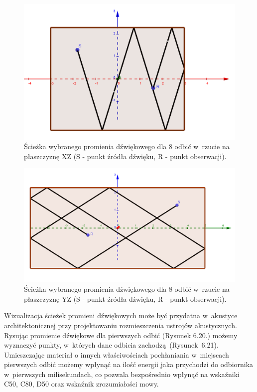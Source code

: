 \begin{figure}[H]
        \centering
                \centering
                \includegraphics[width=12cm]{odbiciay}
	\caption{Ścieżka wybranego promienia dźwiękowego dla 8 odbić w~rzucie na płaszczyznę XZ (S - punkt źródła dźwięku, R - punkt obserwacji).}
\end{figure}

\begin{figure}[H]
        \centering
                \centering
                \includegraphics[width=12cm]{odbiciax}
	\caption{Ścieżka wybranego promienia dźwiękowego dla 8 odbić w~rzucie na płaszczyznę YZ (S - punkt źródła dźwięku, R - punkt obserwacji).}
\end{figure}

Wizualizacja ścieżek promieni dźwiękowych może być przydatna w~akustyce architektonicznej przy projektowaniu rozmieszczenia ustrojów akustycznych. Rysując promienie dźwiękowe dla pierwszych odbić (Rysunek 6.20.) możemy wyznaczyć punkty, w~których dane odbicia zachodzą~(Rysunek~6.21). Umieszczając materiał o innych właściwościach pochłaniania w~miejscach pierwszych odbić możemy wpłynąć na ilość energii jaka przychodzi do odbiornika w~pierwszych milisekundach, co pozwala bezpośrednio wpłynąć na wskaźniki C50, C80, D50 oraz wskaźnik zrozumiałości mowy.

